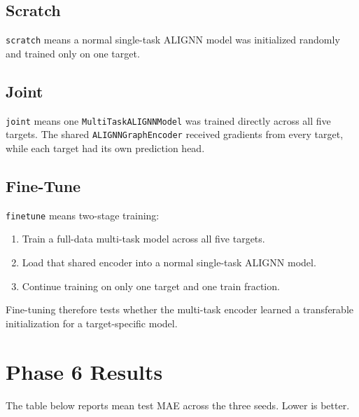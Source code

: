 \documentclass[11pt,a4paper]{article}
\begin{document}
\subsection{Scratch}

\texttt{scratch} means a normal single-task ALIGNN model was initialized randomly and trained only on one target.

\subsection{Joint}

\texttt{joint} means one \texttt{MultiTaskALIGNNModel} was trained directly across all five targets.  The shared \texttt{ALIGNNGraphEncoder} received gradients from every target, while each target had its own prediction head.

\subsection{Fine-Tune}

\texttt{finetune} means two-stage training:

\begin{enumerate}
  \item Train a full-data multi-task model across all five targets.
  \item Load that shared encoder into a normal single-task ALIGNN model.
  \item Continue training on only one target and one train fraction.
\end{enumerate}

Fine-tuning therefore tests whether the multi-task encoder learned a transferable initialization for a target-specific model.

\section{Phase 6 Results}

The table below reports mean test MAE across the three seeds.  Lower is better.
\end{document}
